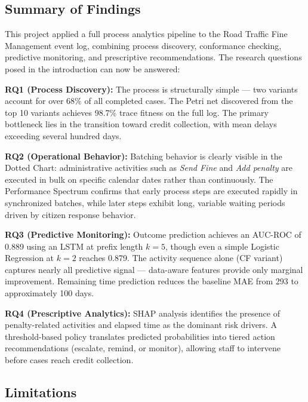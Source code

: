 
\subsection{Summary of Findings}
\label{sub:summary}

This project applied a full process analytics pipeline to the Road Traffic Fine Management event log, combining process discovery, conformance checking, predictive monitoring, and prescriptive recommendations. The research questions posed in the introduction can now be answered:

\textbf{RQ1 (Process Discovery):} The process is structurally simple — two variants account for over 68\% of all completed cases. The Petri net discovered from the top 10 variants achieves 98.7\% trace fitness on the full log. The primary bottleneck lies in the transition toward credit collection, with mean delays exceeding several hundred days.

\textbf{RQ2 (Operational Behavior):} Batching behavior is clearly visible in the Dotted Chart: administrative activities such as \textit{Send Fine} and \textit{Add penalty} are executed in bulk on specific calendar dates rather than continuously. The Performance Spectrum confirms that early process steps are executed rapidly in synchronized batches, while later steps exhibit long, variable waiting periods driven by citizen response behavior.

\textbf{RQ3 (Predictive Monitoring):} Outcome prediction achieves an AUC-ROC of 0.889 using an LSTM at prefix length $k=5$, though even a simple Logistic Regression at $k=2$ reaches 0.879. The activity sequence alone (CF variant) captures nearly all predictive signal — data-aware features provide only marginal improvement. Remaining time prediction reduces the baseline MAE from 293 to approximately 100 days.

\textbf{RQ4 (Prescriptive Analytics):} SHAP analysis identifies the presence of penalty-related activities and elapsed time as the dominant risk drivers. A threshold-based policy translates predicted probabilities into tiered action recommendations (escalate, remind, or monitor), allowing staff to intervene before cases reach credit collection.

\subsection{Limitations}
\label{sub:limitations}

